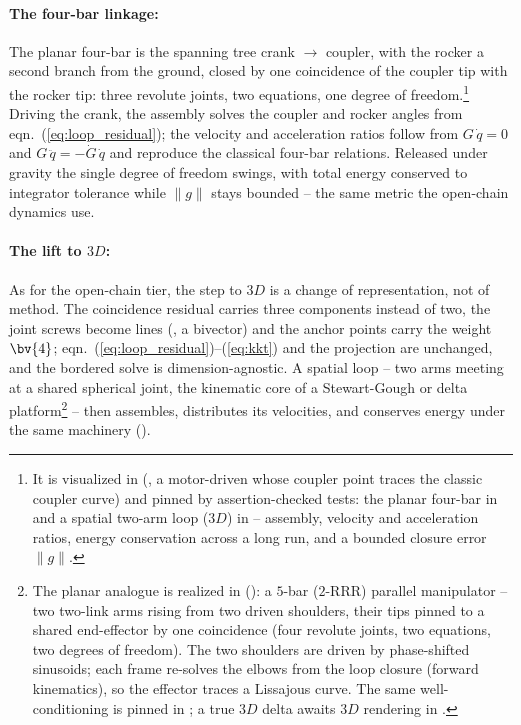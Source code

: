\paragraph{The four-bar linkage:} The planar four-bar is the spanning tree crank $\to$
coupler, with the rocker a second branch from the ground, closed by one coincidence of the
coupler tip with the rocker tip: three revolute joints, two equations, one degree of
freedom.\footnote{It is visualized in 
(, a motor-driven  whose
coupler point traces the classic coupler curve) and pinned by assertion-checked tests: the
planar four-bar in  and a spatial two-arm loop
($3D$) in  -- assembly, velocity and acceleration ratios,
energy conservation across a long run, and a bounded closure error $\lVert g\rVert$.}
Driving the
crank, the assembly solves the coupler and rocker angles from
eqn.~(\ref{eq:loop_residual}); the velocity and acceleration ratios follow from
$G\,\dot{q} = 0$ and $G\,\ddot{q} = -\dot{G}\,\dot{q}$ and reproduce the classical
four-bar relations. Released under gravity the single degree of freedom swings, with total
energy conserved to integrator tolerance while $\lVert g\rVert$ stays bounded -- the same
metric the open-chain dynamics use.

\paragraph{The lift to $3D$:} As for the open-chain tier, the step to $3D$ is a change of
representation, not of method. The coincidence residual carries three components instead
of two, the joint screws become lines (, a bivector) and the anchor points
carry the weight $\bv{4}$; eqn.~(\ref{eq:loop_residual})--(\ref{eq:kkt}) and the
projection are unchanged, and the bordered solve is dimension-agnostic. A spatial loop --
two arms meeting at a shared spherical joint, the kinematic core of a Stewart-Gough or
delta platform\footnote{The planar analogue is realized in 
(): a $5$-bar ($2$-RRR) parallel manipulator -- two
two-link arms rising from two driven shoulders, their tips pinned to a shared end-effector
by one coincidence (four revolute joints, two equations, two degrees of freedom). The two
shoulders are driven by phase-shifted sinusoids; each frame re-solves the elbows from the
loop closure (forward kinematics), so the effector traces a Lissajous curve. The same
well-conditioning is pinned in ; a true $3D$
delta awaits $3D$ rendering in .} -- then assembles, distributes its
velocities, and conserves energy under the same machinery ().



